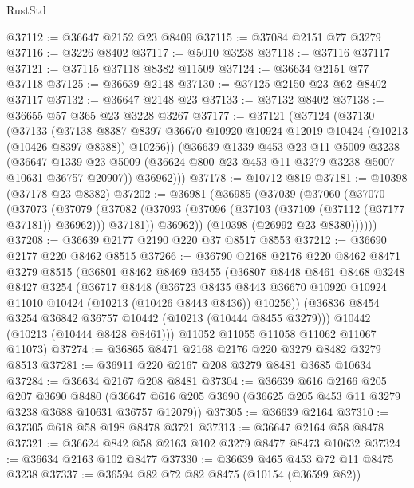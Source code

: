 \begin{lexlean}{RustStd}
\begin{coremodule}
{\begin{coremodule}
{{{{{{{{{{{{{{{{{{{{{{{{{{@37112 := @36647 @2152 @23 @8409
@37115 := @37084 @2151 @77 @3279
@37116 := @3226 @8402
@37117 := @5010 @3238
@37118 := @37116 @37117
@37121 := @37115 @37118 @8382 @11509
@37124 := @36634 @2151 @77 @37118
@37125 := @36639 @2148
@37130 := @37125 @2150 @23 @62 @8402 @37117
@37132 := @36647 @2148 @23
@37133 := @37132 @8402
@37138 := @36655 @57 @365 @23 @3228 @3267
@37177 := @37121
    (@37124
      (@37130
        (@37133
          (@37138
            @8387
            @8397
            @36670
            @10920
            @10924
            @12019
            @10424
            (@10213 (@10426 @8397 @8388))
            @10256))
        (@36639
          @1339
          @453
          @23
          @11
          @5009
          @3238
          (@36647 @1339 @23 @5009 (@36624 @800 @23 @453 @11 @3279 @3238 @5007 @10631 @36757 @20907))
          @36962)))
@37178 := @10712 @819
@37181 := @10398 (@37178 @23 @8382)
@37202 := @36981
    (@36985
      (@37039
        (@37060
          (@37070
            (@37073
              (@37079
                (@37082 (@37093 (@37096 (@37103 (@37109 (@37112 (@37177 @37181)) @36962))) @37181))
                @36962))
            (@10398 (@26992 @23 @8380))))))
@37208 := @36639 @2177 @2190 @220 @37 @8517 @8553
@37212 := @36690 @2177 @220 @8462 @8515
@37266 := @36790
    @2168
    @2176
    @220
    @8462
    @8471
    @3279
    @8515
    (@36801
      @8462
      @8469
      @3455
      (@36807
        @8448
        @8461
        @8468
        @3248
        @8427
        @3254
        (@36717
          @8448
          (@36723
            @8435
            @8443
            @36670
            @10920
            @10924
            @11010
            @10424
            (@10213 (@10426 @8443 @8436))
            @10256))
        (@36836 @8454 @3254 @36842 @36757 @10442 (@10213 (@10444 @8455 @3279)))
        @10442
        (@10213 (@10444 @8428 @8461)))
      @11052
      @11055
      @11058
      @11062
      @11067
      @11073)
@37274 := @36865 @8471 @2168 @2176 @220 @3279 @8482 @3279 @8513
@37281 := @36911 @220 @2167 @208 @3279 @8481 @3685 @10634
@37284 := @36634 @2167 @208 @8481
@37304 := @36639
    @616
    @2166
    @205
    @207
    @3690
    @8480
    (@36647 @616 @205 @3690 (@36625 @205 @453 @11 @3279 @3238 @3688 @10631 @36757 @12079))
@37305 := @36639 @2164
@37310 := @37305 @618 @58 @198 @8478 @3721
@37313 := @36647 @2164 @58 @8478
@37321 := @36624 @842 @58 @2163 @102 @3279 @8477 @8473 @10632
@37324 := @36634 @2163 @102 @8477
@37330 := @36639 @465 @453 @72 @11 @8475 @3238
@37337 := @36594 @82 @72 @82 @8475 (@10154 (@36599 @82))
}}}}}}}}}}}}}}}}}}}}}}}}}}
\end{coremodule}}
\end{coremodule}
\end{lexlean}
